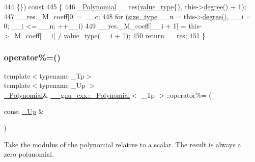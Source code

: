 \begin{DoxyCode}
444                                           \{\}) \textcolor{keyword}{const}
445       \{
446         \hyperlink{class____gnu__cxx_1_1__Polynomial_ad2baf4c12b7e3ab131a592afa3f391ae}{\_Polynomial} \_\_res(\hyperlink{class____gnu__cxx_1_1__Polynomial_a725563351f50e76084a7a016c06f8a53}{value\_type}\{\}, this->\hyperlink{class____gnu__cxx_1_1__Polynomial_a07d9933aeeb9afbd823218ed921336cb}{degree}() + 1);
447         \_\_res.\_M\_coeff[0] = \_\_c;
448         \textcolor{keywordflow}{for} (\hyperlink{class____gnu__cxx_1_1__Polynomial_a8b25fcfd4acaad0c5c08b649c22da28a}{size\_type} \_\_n = this->\hyperlink{class____gnu__cxx_1_1__Polynomial_a07d9933aeeb9afbd823218ed921336cb}{degree}(), \_\_i = 0; \_\_i <= \_\_n; ++\_\_i)
449           \_\_res.\_M\_coeff[\_\_i + 1] = this->\_M\_coeff[\_\_i] / \hyperlink{class____gnu__cxx_1_1__Polynomial_a725563351f50e76084a7a016c06f8a53}{value\_type}(\_\_i + 1);
450         \textcolor{keywordflow}{return} \_\_res;
451       \}
\end{DoxyCode}
\mbox{\label{class____gnu__cxx_1_1__Polynomial_ade8196c94c8e169f00730730d0c6b99e}} 
\subsubsection{\texorpdfstring{operator\%=()}{operator\%=()}\hspace{0.1cm}{\footnotesize\ttfamily [1/2]}}
{\footnotesize\ttfamily template$<$typename \+\_\+\+Tp$>$ \\
template$<$typename \+\_\+\+Up $>$ \\
\hyperlink{class____gnu__cxx_1_1__Polynomial}{\+\_\+\+Polynomial}\& \hyperlink{class____gnu__cxx_1_1__Polynomial}{\+\_\+\+\_\+gnu\+\_\+cxx\+::\+\_\+\+Polynomial}$<$ \+\_\+\+Tp $>$\+::operator\%= (\begin{DoxyParamCaption}\item[{const \hyperlink{class____gnu__cxx_1_1__Polynomial_a242114d4b86648a5dff67a8221f80d40}{\+\_\+\+Up} \&}]{ }\end{DoxyParamCaption})\hspace{0.3cm}{\ttfamily [inline]}}

Take the modulus of the polynomial relative to a scalar. The result is always a zero polunomial. 

